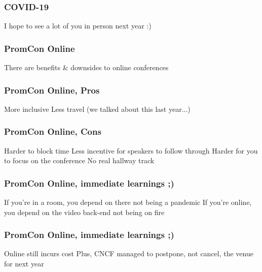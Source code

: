 \documentclass[aspectratio=169]{beamer}
\begin{document}
\begin{frame}
	\frametitle{COVID-19}
	\centering
	\vfill
	I hope to see a lot of you in person next year :)
	\vfill
\end{frame}

\begin{frame}
	\frametitle{PromCon Online}
	\centering
	\vfill
	There are benefits \& downsides to online conferences
	\vfill
\end{frame}

\begin{frame}
	\frametitle{PromCon Online, Pros}
	\centering
	\vfill
	More inclusive
	\vfill
	Less travel (we talked about this last year...)
	\vfill
\end{frame}

\begin{frame}
	\frametitle{PromCon Online, Cons}
	\centering
	\vfill
	Harder to block time
	\vfill
	Less incentive for speakers to follow through
	\vfill
	Harder for you to focus on the conference
	\vfill
	No real hallway track
	\vfill
\end{frame}

\begin{frame}
	\frametitle{PromCon Online, immediate learnings ;)}
	\centering
	\vfill
	If you're in a room, you depend on there not being a pandemic
	\vfill
	If you're online, you depend on the video back-end not being on fire
	\vfill
\end{frame}

\begin{frame}
	\frametitle{PromCon Online, immediate learnings ;)}
	\centering
	\vfill
	Online still incurs cost
	\vfill
	Plus, CNCF managed to postpone, not cancel, the venue for next year
	\vfill
\end{frame}
\end{document}
